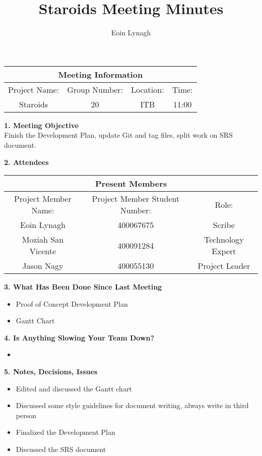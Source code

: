 \documentclass[12pt]{article}
\title{Staroids Meeting Minutes}
\author{Eoin Lynagh}
\begin{document}
\maketitle
\begin{center}
 \begin{tabular}{| c | c | c |  c |}
 \hline
 \multicolumn{4}{|c|}{Meeting Information} \\
\hline
 Project Name: & Group Number: & Location: & Time: \\
 \hline
 Staroids & 20 & ITB & 11:00 \\
\hline
\end{tabular}
\end{center}
\begin{flushleft}


\textbf{1. Meeting Objective}\\
Finish the Development Plan, update Git and tag files, split work on SRS document.

\textbf{2. Attendees}\\
\begin{center}
 \begin{tabular}{|c | c | c | }
 \hline
 \multicolumn{3}{|c|}{Present Members} \\
\hline
 Project Member Name: & Project Member Student Number: & Role: \\
 \hline\hline
 Eoin Lynagh & 400067675 & Scribe \\
\hline
Moziah San Vicente & 400091284 & Technology Expert \\
\hline
 Jason Nagy & 400055130 & Project Leader \\
\hline
\end{tabular}
\end{center}

\textbf{3. What Has Been Done Since Last Meeting}\\
\begin{itemize}
\item Proof of Concept Development Plan
\item Gantt Chart
\end{itemize}

\textbf{4. Is Anything Slowing Your Team Down?}\\
\begin{itemize}
\item
\end{itemize}

\textbf{5. Notes, Decisions, Issues}\\
\begin{itemize}
\item Edited and discussed the Gantt chart\\
\item Discussed some style guidelines for document writing, always write in third person\\
\item Finalized the Development Plan\\
\item Discussed the SRS document\\
\end{itemize}



\end{flushleft}
\end{document}

